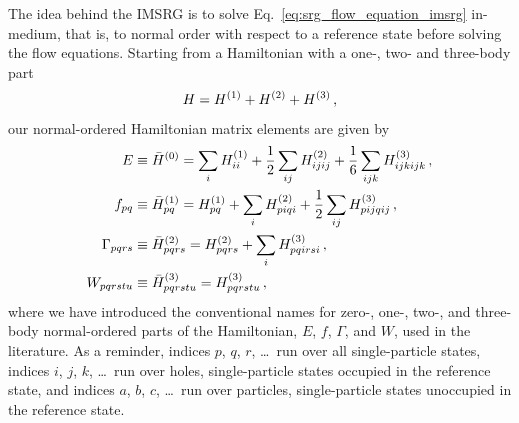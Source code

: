 The idea behind the IMSRG is to solve Eq.~\eqref{eq:srg_flow_equation_imsrg} in-medium,
that is, to normal order with respect to a reference state before solving the flow equations.
Starting from a Hamiltonian with a one-, two- and three-body part
\begin{equation}
  H = {H}^{(1)} + {H}^{(2)} + {H}^{(3)}\,,
\end{equation}
our normal-ordered Hamiltonian matrix elements are given by
\begin{align}
  E             & \equiv {\bar{H}}^{(0)} = \sum_i {H}^{(1)}_{ii} + \frac{1}{2}\sum_{ij} {H}^{(2)}_{ijij} + \frac{1}{6} \sum_{ijk} {H}^{(3)}_{ijkijk}\,, \\
  f_{pq}        & \equiv {\bar{H}}^{(1)}_{pq} = {H}^{(1)}_{pq} + \sum_i {H}^{(2)}_{piqi} + \frac{1}{2} \sum_{ij} {H}^{(3)}_{pijqij} \,,                  \\
  \Gamma_{pqrs} & \equiv {\bar{H}}^{(2)}_{pqrs} = {H}^{(2)}_{pqrs} + \sum_i {H}^{(3)}_{pqirsi} \,,                                                           \\
  W_{pqrstu}    & \equiv {\bar{H}}^{(3)}_{pqrstu} = {H}^{(3)}_{pqrstu} \,,
\end{align}
where we have introduced the conventional names
for zero-, one-, two-, and three-body normal-ordered parts of the Hamiltonian,
$E$, $f$, $\Gamma$, and $W$,
used in the literature.
As a reminder,
indices $p$, $q$, $r$, \ldots\ run over all single-particle states,
indices $i$, $j$, $k$, \ldots\ run over holes,
single-particle states occupied in the reference state,
and indices $a$, $b$, $c$, \ldots\ run over particles,
single-particle states unoccupied in the reference state.

